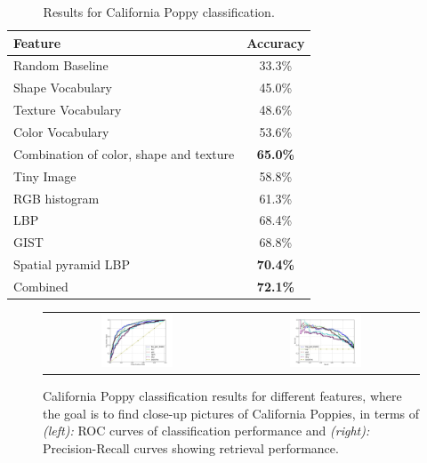 \begin{table}
{\footnotesize{
\begin{center}
\begin{tabular}{|l|c|}
\hline 
Feature  & Accuracy\tabularnewline
\hline 
\hline 
Random Baseline  & 33.3\%\tabularnewline
\hline 
\hline
Shape Vocabulary & 45.0\% \tabularnewline
\hline 
Texture Vocabulary & 48.6\%\tabularnewline
\hline 
Color Vocabulary & 53.6\%\tabularnewline
\hline 
Combination of color, shape and texture  & \textbf{65.0\%}\tabularnewline
\hline
\hline
Tiny Image & 58.8\%\tabularnewline
\hline 
RGB histogram & 61.3\%\tabularnewline
\hline 
LBP & 68.4\% \tabularnewline
\hline 
GIST & 68.8\%\tabularnewline
\hline 
Spatial pyramid LBP & \textbf{70.4\%}\tabularnewline
\hline  \hline
Combined & \textbf{72.1\%}\tabularnewline
\hline 
\end{tabular}
\end{center}
}}
\vspace{-8pt}
\caption{Results for California Poppy classification.}
\label{tab:global_features}
\vspace{-18pt}
\end{table}





\begin{figure}[th]
\begin{center}
\vspace{-12pt}
\begin{tabular}{cc}
\includegraphics[width=0.4\textwidth]{figs/ROC-curves_poppytype1.jpg} &
\includegraphics[width=0.4\textwidth]{figs/PR-curves_poppytype1.jpg} \\
\end{tabular}
\end{center}
\vspace{-12pt}
\caption{
California Poppy classification results for different features, where the goal is to find close-up pictures of California Poppies, in terms of {\textit{(left):}} ROC curves of classification performance and
{\textit{(right):}} Precision-Recall curves showing retrieval performance.
}
\label{fig:PR_ROC_poppy}
\end{figure}




